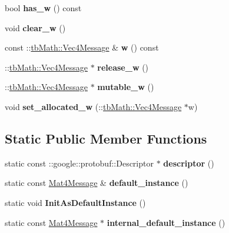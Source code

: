 \begin{DoxyCompactItemize}
bool {\bfseries has\+\_\+w} () const
\item 
\mbox{\label{classtbMath_1_1Mat4Message_a49f7620adb0e15cfae3cf6eb9f67c5fc}} 
void {\bfseries clear\+\_\+w} ()
\item 
\mbox{\label{classtbMath_1_1Mat4Message_a40c7d5b6a8c79c6e9cffb9963d8fca6e}} 
const \+::\hyperlink{classtbMath_1_1Vec4Message}{tb\+Math\+::\+Vec4\+Message} \& {\bfseries w} () const
\item 
\mbox{\label{classtbMath_1_1Mat4Message_a6ec23594eda0976f443810effbafb09e}} 
\+::\hyperlink{classtbMath_1_1Vec4Message}{tb\+Math\+::\+Vec4\+Message} $\ast$ {\bfseries release\+\_\+w} ()
\item 
\mbox{\label{classtbMath_1_1Mat4Message_a63a94558c224e8112fc06bce4c502798}} 
\+::\hyperlink{classtbMath_1_1Vec4Message}{tb\+Math\+::\+Vec4\+Message} $\ast$ {\bfseries mutable\+\_\+w} ()
\item 
\mbox{\label{classtbMath_1_1Mat4Message_a7e41995a8b170517e50cc1f9db11ea80}} 
void {\bfseries set\+\_\+allocated\+\_\+w} (\+::\hyperlink{classtbMath_1_1Vec4Message}{tb\+Math\+::\+Vec4\+Message} $\ast$w)
\end{DoxyCompactItemize}
\subsection*{Static Public Member Functions}
\begin{DoxyCompactItemize}
\item 
\mbox{\label{classtbMath_1_1Mat4Message_a0cba522f1d65a8a1b4dec7a427991474}} 
static const \+::google\+::protobuf\+::\+Descriptor $\ast$ {\bfseries descriptor} ()
\item 
\mbox{\label{classtbMath_1_1Mat4Message_a57032c1857b1cf026365812ebc302f33}} 
static const \hyperlink{classtbMath_1_1Mat4Message}{Mat4\+Message} \& {\bfseries default\+\_\+instance} ()
\item 
\mbox{\label{classtbMath_1_1Mat4Message_a626a99226c02036e84903a6905c5fe57}} 
static void {\bfseries Init\+As\+Default\+Instance} ()
\item 
\mbox{\label{classtbMath_1_1Mat4Message_a4fd98c6f46b18f079a902a4c61a9cb05}} 
static const \hyperlink{classtbMath_1_1Mat4Message}{Mat4\+Message} $\ast$ {\bfseries internal\+\_\+default\+\_\+instance} ()
\end{DoxyCompactItemize}
